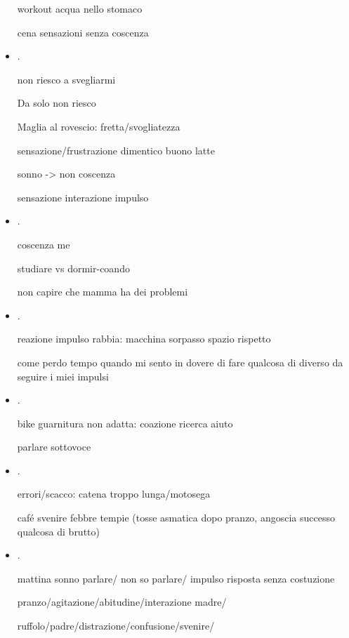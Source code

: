 \begin{itemize}
workout acqua nello stomaco

cena sensazioni senza coscenza

\item {}.

non riesco a svegliarmi

Da solo non riesco

Maglia al rovescio: fretta/svogliatezza

sensazione/frustrazione dimentico buono latte

sonno -> non coscenza

sensazione interazione impulso

\item {}.

coscenza me

studiare vs dormir-coando

non capire che mamma ha dei problemi

\item {}.

reazione impulso rabbia: macchina sorpasso spazio rispetto

come perdo tempo quando mi sento in dovere di fare qualcosa di diverso da seguire i miei impulsi

\item {}.

bike guarnitura non adatta: coazione ricerca aiuto


parlare sottovoce

\item {}.

errori/scacco: catena troppo lunga/motosega

caf\'e svenire febbre tempie (tosse asmatica dopo pranzo, angoscia successo qualcosa di brutto)




\item {}.

mattina sonno parlare/ non so parlare/ impulso risposta senza costuzione

pranzo/agitazione/abitudine/interazione madre/


ruffolo/padre/distrazione/confusione/svenire/


\end{itemize}
